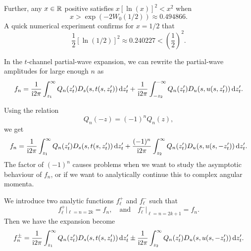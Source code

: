  Further, any $x\in\mathbb{R}$ positive satisfies $x[\ln(x)]^{2}<x^{2}$
when
\begin{equation}
x > \exp\left(-2W_{0}(1/2)\right)\approx 0.494866.
\end{equation}
A quick numerical experiment confirms for $x=1/2$ that
\begin{equation}
\frac{1}{2}[\ln(1/2)]^{2}\approx0.240227 < \left(\frac{1}{2}\right)^{2}.
\end{equation}

\M[-1]
In the $t$-channel partial-wave expansion,
we can rewrite the partial-wave amplitudes for large enough $n$ as
\begin{equation}
f_{n} = \frac{1}{\mathrm{i}2\pi}\int^{\infty}_{z_{1}}Q_{n}(z_{t}')D_{s}(s,t(s,z_{t}'))\,\mathrm{d} z_{t}'
+ \frac{1}{\mathrm{i}2\pi}\int^{-\infty}_{-z_{2}}Q_{n}(z_{t}')D_{u}(s,u(s,z_{t}'))\,\mathrm{d} z_{t}'.
\end{equation}


\M
Using the relation
\begin{equation}
Q_{n}(-z)=(-1)^{n}Q_{n}(z),
\end{equation}
we get
\begin{equation}
f_{n} = \frac{1}{\mathrm{i}2\pi}\int^{\infty}_{z_{1}}Q_{n}(z_{t}')D_{s}(s,t(s,z_{t}'))\,\mathrm{d} z_{t}'
+ \frac{(-1)^{n}}{\mathrm{i}2\pi}\int^{\infty}_{z_{2}}Q_{n}(z_{t}')D_{u}(s,u(s,-z_{t}'))\,\mathrm{d} z_{t}'.
\end{equation}
The factor of $(-1)^{n}$ causes problems when we want to study the
asymptotic behaviour of $f_{n}$, or if we want to analytically continue
this to complex angular momenta.

\begin{theorem}
We introduce two analytic functions $f^{+}_{\ell}$ and
$f^{-}_{\ell}$ such that
\begin{equation}
f^{+}_{\ell}|_{\ell=n=2k}=f_{n},\quad\mbox{and}\quad
f^{-}_{\ell}|_{\ell=n=2k+1}=f_{n}.
\end{equation}
Then we have the expansion become
\begin{equation}\label{eq:t-channel:froissart-gribov-transformed}
f^{\pm}_{n} = \frac{1}{\mathrm{i}2\pi}\int^{\infty}_{z_{1}}Q_{n}(z_{t}')D_{s}(s,t(s,z_{t}'))\,\mathrm{d} z_{t}'
\pm \frac{1}{\mathrm{i}2\pi}\int^{\infty}_{z_{2}}Q_{n}(z_{t}')D_{u}(s,u(s,-z_{t}'))\,\mathrm{d} z_{t}'.
\end{equation}
\end{theorem}

